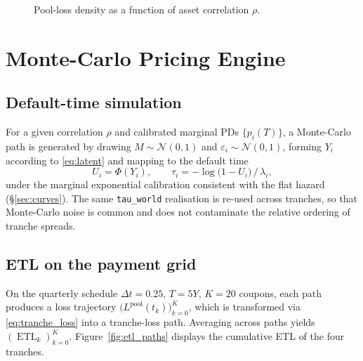 \documentclass[11pt,a4paper]{article}
\newcommand{\1}{\mathbf{1}}
\newcommand{\Nor}{\mathcal{N}}
\DeclareMathOperator{\ETL}{ETL}
\begin{document}
\begin{figure}[H]
    \centering
    \caption{Pool-loss density as a function of asset correlation
    \(\rho\).}
    \label{fig:lhp_rho}
\end{figure}

\section{Monte-Carlo Pricing Engine}\label{sec:mc}

\subsection{Default-time simulation}
For a given correlation \(\rho\) and calibrated marginal PDs
\(\{p_{i}(T)\}\), a Monte-Carlo path is generated by drawing
\(M\sim\Nor(0,1)\) and \(\varepsilon_{i}\sim\Nor(0,1)\), forming
\(Y_{i}\) according to \eqref{eq:latent} and mapping to the default
time
\begin{equation}
U_{i}=\Phi(Y_{i}),\qquad
\tau_{i}=-\log\bigl(1-U_{i}\bigr)\,\big/\,\lambda_{i},
\label{eq:default_time}
\end{equation}
under the marginal exponential calibration consistent with the flat
hazard (\S\ref{sec:curves}). The same \texttt{tau\_world} realisation is
re-used across tranches, so that Monte-Carlo noise is common and does
not contaminate the relative ordering of tranche spreads.

\subsection{ETL on the payment grid}
On the quarterly schedule \(\Delta t = 0.25\), \(T=5Y\),
\(K=20\) coupons, each path produces a loss trajectory
\(\bigl(L^{\text{pool}}(t_{k})\bigr)_{k=0}^{K}\), which is transformed
via \eqref{eq:tranche_loss} into a tranche-loss path. Averaging across
paths yields \((\ETL_{k})_{k=0}^{K}\). Figure~\ref{fig:etl_paths}
displays the cumulative ETL of the four tranches.
\end{document}
